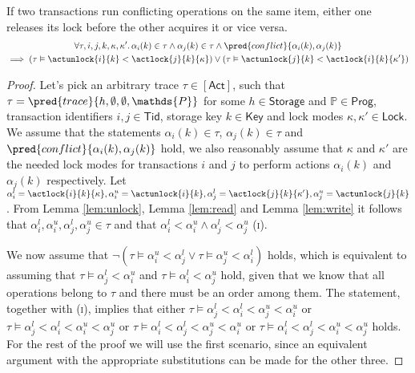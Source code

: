 \lem \label{lem:conflict} If two transactions run conflicting operations on the same item, either one releases its lock before the other acquires it or vice versa.
\begin{gather*}
\forall \tau, i, j, k, \kappa, \kappa' \ldotp 
\alpha_i(k) \in \tau \land \alpha_j(k) \in \tau \land \pred{conflict}{\alpha_i(k), \alpha_j(k)} 
\\
\implies \left( \tau \vDash \actunlock{i}{k} < \actlock{j}{k}{\kappa} \right) \lor \left( \tau \vDash \actunlock{j}{k} < \actlock{i}{k}{\kappa'} \right)
\end{gather*}

\begin{proof}
Let's pick an arbitrary trace $\tau \in \mathsf{[Act]}$, such that $\tau = \pred{trace}{h, \emptyset, \emptyset, \mathds{P}}$ for some $h \in \mathsf{Storage}$ and $\mathds{P} \in \mathsf{Prog}$, transaction identifiers $i, j \in \mathsf{Tid}$, storage key $k \in \mathsf{Key}$ and lock modes $\kappa, \kappa' \in \mathsf{Lock}$. We assume that the statements $\alpha_i(k) \in \tau$, $\alpha_j(k) \in \tau$ and $\pred{conflict}{\alpha_i(k), \alpha_j(k)}$ hold, we also reasonably assume that $\kappa$ and $\kappa'$ are the needed lock modes for transactions $i$ and $j$ to perform actions $\alpha_i(k)$ and $\alpha_j(k)$ respectively. Let $\alpha_i^l = \actlock{i}{k}{\kappa}, \alpha_i^u = \actunlock{i}{k}, \alpha_j^l = \actlock{j}{k}{\kappa'}, \alpha_j^u = \actunlock{j}{k}$. From Lemma \ref{lem:unlock}, Lemma \ref{lem:read} and Lemma \ref{lem:write} it follows that $\alpha_i^l, \alpha_i^u, \alpha_j^l, \alpha_j^u \in \tau$ and that $\alpha_i^l < \alpha_i^u \land \alpha_j^l < \alpha_j^u$ (\textsc{i}).

We now assume that $\lnot \left( \tau \vDash \alpha_i^u < \alpha_j^l  \lor \tau \vDash \alpha_j^u < \alpha_i^l \right)$ holds, which is equivalent to assuming that $\tau \vDash \alpha_j^l < \alpha_i^u$ and $\tau \vDash \alpha_i^l < \alpha_j^u$ hold, given that we know that all operations belong to $\tau$ and there must be an order among them. The statement, together with (\textsc{i}), implies that either $\tau \vDash \alpha_j^l < \alpha_i^l < \alpha_j^u < \alpha_i^u$ or $\tau \vDash \alpha_j^l < \alpha_i^l < \alpha_i^u < \alpha_j^u$ or $\tau \vDash \alpha_i^l < \alpha_j^l < \alpha_j^u < \alpha_i^u$ or $\tau \vDash \alpha_i^l < \alpha_j^l < \alpha_i^u < \alpha_j^u$ holds. For the rest of the proof we will use the first scenario, since an equivalent argument with the appropriate substitutions can be made for the other three.


\end{proof}
